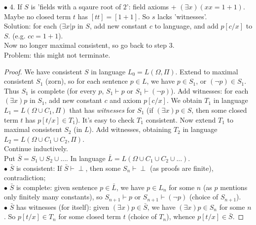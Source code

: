 \documentclass[a4paper]{article}
\begin{document}
\begin{thm}
$\bullet$ 4. If $S$ is 'fields with a sqaure root of $2$': field axioms + $(\exists x) (xx=1+1)$. Maybe no closed term $t$ has $[tt] = [1+1]$. So $s$ lacks 'witnesses'.\\
Solution: for each $(\exists x|p$ in $S$, add new constant $c$ to language, and add $p[c/x]$ to $S$. (e.g. $cc=1+1$).\\
Now no longer maximal consistent, so go back to step 3.\\
Problem: this might not terminate.
\begin{proof}
We have consistent $S$ in language $L_0 = L(\Omega,\Pi)$. Extend to maximal consistent $S_1$ (zorn), so for each sentence $p \in L$, we have $p \in S_1$, or $(\neg p) \in S_1$. Thus $S_1$ is complete (for every $p$, $S_1 \vdash p$ or $S_1 \vdash (\neg p)$). Add witnesses: for each $(\exists x) p$ in $S_1$, add new constant $c$ and axiom $p[c/x]$. We obtain $T_1$ in language $L_1 = L(\Omega \cup C_1,\Pi)$ that has \emph{witnesses} for $S_1$ (if $(\exists x) p \in S$, then some closed term $t$ has $p[t/x] \in T_1$). It's easy to check $T_1$ consistent. Now extend $T_1$ to maximal consistent $S_2$ (in $L$). Add witnesses, obtaining $T_2$ in language $L_2 =L(\Omega \cup C_1 \cup C_2, \Pi)$.\\
Continue inductively.\\
Put $\bar{S} = S_1 \cup S_2 \cup ...$. In language $\bar{L} = L(\Omega \cup C_1\cup C_2 \cup ...)$.\\
$\bullet$ $\bar{S}$ is consistent: If $\bar{S} \vdash \perp$, then some $S_n \vdash \perp$ (as proofs are finite), contradiction;\\
$\bullet$ $\bar{S}$ is complete: given sentence $p \in \bar{L}$, we have $p \in L_n$ for some $n$ (as $p$ mentions only finitely many constants), so $S_{n+1} \vdash p$ or $S_{n+1} \vdash (\neg p)$ (choice of $S_{n+1}$).\\
$\bullet$ $\bar{S}$ has witnesses (for itself): given $(\exists x)p \in \bar{S}$, we have $(\exists x)p \in S_n$ for some $n$. So $p[t/x] \in T_n$ for some closed term $t$ (choice of $T_n$), whence $p[t/x] \in \bar{S}$.
\end{proof}
\end{thm}


\iffalse
\begin{equation*}
\begin{aligned}

\end{aligned}
\end{equation*}
\fi
\end{document}
